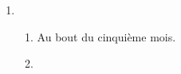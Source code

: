 
\medskip

%
%

\begin{enumerate}
\item %
	\begin{enumerate}
		\item %
Au bout du cinquième mois.
		\item %


\end{enumerate}
\end{enumerate}
